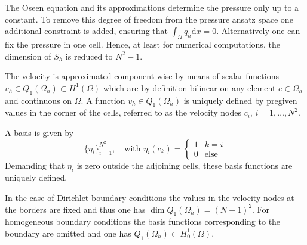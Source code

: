 \documentclass[a4paper,10pt,BCOR=15mm]{scrbook}
\providecommand{\inva}[1]{\text{d} #1}
\begin{document}
\begin{rem}
 The Oseen equation and its approximations determine the pressure only up to a constant. To remove this degree of freedom from the pressure ansatz space one additional constraint is added, ensuring that $\int_\Omega q_h \inva x =0 $. Alternatively one can fix the pressure in one cell. Hence, at least for numerical computations, the dimension of $S_h$ is reduced to $N^2-1$.
\end{rem}


The velocity is approximated component-wise by means of scalar functions $v_h \in Q_1(\Omega_h) \subset H^1(\Omega)$ which are by definition bilinear on any element $e \in \Omega_h$ and continuous on $\Omega$. A function $v_h \in Q_1(\Omega_h)$ is uniquely defined by pregiven values in the corner of the cells, referred to as the velocity nodes $c_i$, $i=1,\dotsc,N^2$. 

A basis is given by 
\begin{equation*}
 \bigl \{ \eta_i\bigr \}_{i=1}^{N^2}, \quad \text{with } \eta_i(c_k) = \begin{cases} 
1& k=i\\ 
0& \text{else}
\end{cases} 
\end{equation*}
Demanding that $\eta_i$ is zero outside the adjoining cells, these basis functions are uniquely defined.

In the case of Dirichlet boundary conditions the values in the velocity nodes at the borders are fixed and thus one has $\dim Q_1(\Omega_h) = (N-1)^2$. For homogeneous boundary conditions the basis functions corresponding to the boundary are omitted and one has $Q_1(\Omega_h) \subset H_0^1(\Omega)$.
\end{document}
